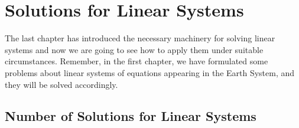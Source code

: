 \chapter{Solutions for Linear Systems}
\label{chap:SolLinSys}

The last chapter has introduced the necessary machinery for solving linear systems and now we are going to see how to apply them under suitable circumstances. Remember, in the first chapter, we have formulated some problems about linear systems of equations appearing in the Earth System, and they will be solved accordingly.

\section{Number of Solutions for Linear Systems}
\label{section:NoSolLinSys}

